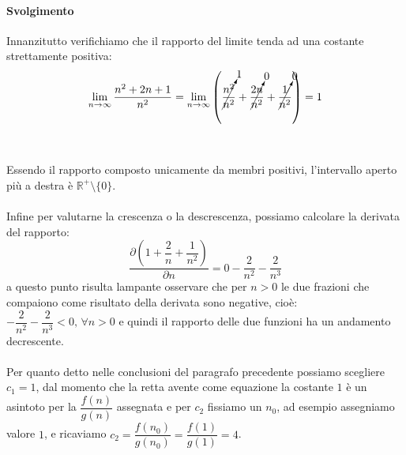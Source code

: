 \documentclass[11pt,a4paper,oneside]{article}
\begin{document}
\paragraph*{Svolgimento} Innanzitutto verifichiamo che il rapporto del limite tenda ad una costante strettamente positiva: $$\lim_{n\to \infty} \dfrac{n^2+2n+1}{n^2} = \lim_{n\to \infty} \left( \cancelto{1}{\dfrac{n^2}{n^2}} + \cancelto{0}{\dfrac{2n}{n^2}} + \cancelto{0}{\dfrac{1}{n^2}}\right) = 1$$\\\\Essendo il rapporto composto unicamente da membri positivi, l'intervallo aperto più a destra è $\mathbb{R}^{+}\setminus{\{0\}}$.\\\\Infine per valutarne la crescenza o la descrescenza, possiamo calcolare la derivata del rapporto:
$$\dfrac{\partial \left(1+\dfrac{2}{n}+\dfrac{1}{n^2} \right)}{\partial n} = 0 - \dfrac{2}{n^2} - \dfrac{2}{n^3}$$
a questo punto risulta lampante osservare che per $n > 0$ le due frazioni che compaiono come risultato della derivata sono negative, cioè: $-\dfrac{2}{n^2} -\dfrac{2}{n^3}<0,\,\forall n > 0$ e quindi il rapporto delle due funzioni ha un andamento decrescente.\\\\Per quanto detto nelle conclusioni del paragrafo precedente possiamo scegliere $c_1 = 1$, dal momento che la retta avente come equazione la costante $1$ è un asintoto per la $\dfrac{f(n)}{g(n)}$ assegnata e per $c_2$ fissiamo un $n_0$, ad esempio assegniamo valore $1$, e ricaviamo $c_2 = \dfrac{f(n_0)}{g(n_0)} = \dfrac{f(1)}{g(1)} = 4$.
\end{document}
